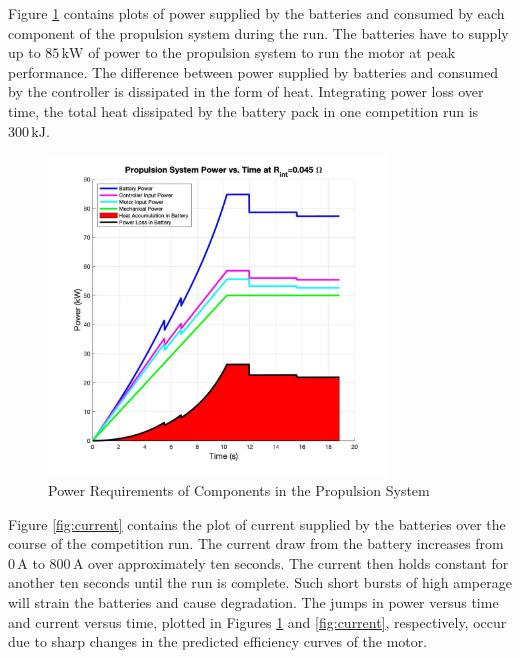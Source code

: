\documentclass[11pt]{article}
\numberwithin{equation}{subsection} %
\newcommand{\unit}[1]{\ensuremath{\, \mathrm{#1}}}             %
\begin{document}
\pagebreak 

Figure \ref{fig:prop} contains plots of power supplied by the batteries and consumed by each component of the propulsion system during the run. The batteries have to supply up to $85\unit{kW}$ of power to the propulsion system to run the motor at peak performance. The difference between power supplied by batteries and consumed by the controller is dissipated in the form of heat. Integrating power loss over time, the total heat dissipated by the battery pack in one competition run is $300\unit{kJ}$.

\begin{figure}[!htb]
    \centering
    \includegraphics[width=0.8\textwidth]{fig/prop.jpg}
    \caption{Power Requirements of Components in the Propulsion System}
    \label{fig:prop}
\end{figure}

Figure \ref{fig:current} contains the plot of current supplied by the batteries over the course of the competition run. The current draw from the battery increases from $0\unit{A}$ to $800\unit{A}$ over approximately ten seconds. The current then holds constant for another ten seconds until the run is complete. Such short bursts of high amperage will strain the batteries and cause degradation. The jumps in power versus time and current versus time, plotted in Figures \ref{fig:prop} and \ref{fig:current}, respectively, occur due to sharp changes in the predicted efficiency curves of the motor.
\end{document}
